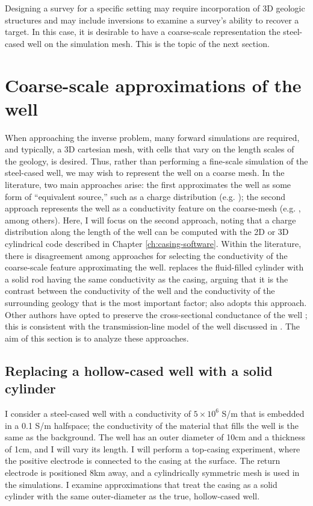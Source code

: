 Designing a survey for a specific setting may require incorporation of 3D geologic structures and may include inversions to examine a survey's ability to recover a target. In this case, it is desirable to have a coarse-scale representation the steel-cased well on the simulation mesh. This is the topic of the next section.
\section{Coarse-scale approximations of the well}
\label{sec:approximating_wells}

When approaching the inverse problem, many forward simulations are required, and typically, a 3D cartesian mesh, with cells that vary on the length scales of the geology, is desired. Thus, rather than performing a fine-scale simulation of the steel-cased well, we may wish to represent the well on a coarse mesh. In the literature, two main approaches arise: the first approximates the well as some form of ``equivalent source,'' such as a charge distribution (e.g. \cite{Weiss2016}); the second approach represents the well as a conductivity feature on the coarse-mesh (e.g. \cite{Swidinsky2013, Um2015, Yang2016, Kohnke2017, Puzyrev2017}, among others). Here, I will focus on the second approach, noting that a charge distribution along the length of the well can be computed with the 2D or 3D cylindrical code described in Chapter \ref{ch:casing-software}. Within the literature, there is disagreement among approaches for selecting the conductivity of the coarse-scale feature approximating the well. \cite{Um2015} replaces the fluid-filled cylinder with a solid rod having the same conductivity as the casing, arguing that it is the contrast between the conductivity of the well and the conductivity of the surrounding geology that is the most important factor; \cite{Puzyrev2017} also adopts this approach. Other authors have opted to preserve the cross-sectional conductance of the well \citep{Swidinsky2013, Kohnke2017}; this is consistent with the transmission-line model of the well discussed in \cite{Kaufman1990}. The aim of this section is to analyze these approaches.
\subsection{Replacing a hollow-cased well with a solid cylinder}
I consider a steel-cased well with a conductivity of $5\times10^6$ S/m that is embedded in a 0.1 S/m halfspace; the conductivity of the material that fills the well is the same as the background. The well has an outer diameter of 10cm and a thickness of 1cm, and I will vary its length. I will perform a top-casing experiment, where the positive electrode is connected to the casing at the surface. The return electrode is positioned 8km away, and a cylindrically symmetric mesh is used in the simulations. I examine approximations that treat the casing as a solid cylinder with the same outer-diameter as the true, hollow-cased well.

